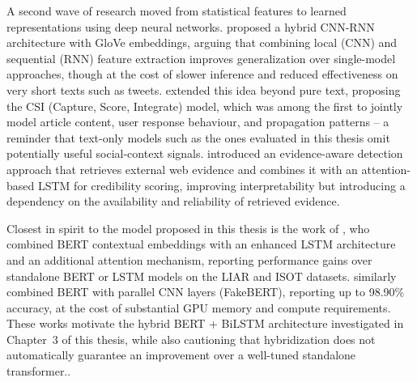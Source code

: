 A second wave of research moved from statistical features to learned representations using deep neural networks. \citet{Nasir2021FakeNews} proposed a hybrid CNN-RNN architecture with GloVe embeddings, arguing that combining local (CNN) and sequential (RNN) feature extraction improves generalization over single-model approaches, though at the cost of slower inference and reduced effectiveness on very short texts such as tweets. \citet{Ruchansky2017CSI} extended this idea beyond pure text, proposing the CSI (Capture, Score, Integrate) model, which was among the first to jointly model article content, user response behaviour, and propagation patterns -- a reminder that text-only models such as the ones evaluated in this thesis omit potentially useful social-context signals. \citet{Popat2019DeClarE} introduced an evidence-aware detection approach that retrieves external web evidence and combines it with an attention-based LSTM for credibility scoring, improving interpretability but introducing a dependency on the availability and reliability of retrieved evidence.

Closest in spirit to the model proposed in this thesis is the work of \citet{Rai2022FakeNews}, who combined BERT contextual embeddings with an enhanced LSTM architecture and an additional attention mechanism, reporting performance gains over standalone BERT or LSTM models on the LIAR and ISOT datasets. \citet{Kaliyar2021FakeBERT} similarly combined BERT with parallel CNN layers (FakeBERT), reporting up to 98.90\% accuracy, at the cost of substantial GPU memory and compute requirements. These works motivate the hybrid BERT + BiLSTM architecture investigated in Chapter~3 of this thesis, while also cautioning that hybridization does not automatically guarantee an improvement over a well-tuned standalone transformer..


